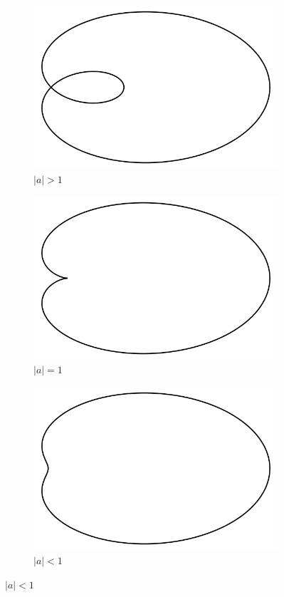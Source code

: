 \documentclass[12pt]{article}
\begin{document}
\begin{figure}[h!]
  \centering
      \begin{subfigure}[b]{0.3\linewidth}
    \includegraphics[width=\linewidth]{./assets/3-1-1/limacon-a-gt-1.png}
    \caption{$|a|>1$}
  \end{subfigure}
  \begin{subfigure}[b]{0.3\linewidth}
    \includegraphics[width=\linewidth]{./assets/3-1-1/limacon-a-eq-1.png}
    \caption{$|a|=1$}
  \end{subfigure}  
  \begin{subfigure}[b]{0.3\linewidth}
    \includegraphics[width=\linewidth]{./assets/3-1-1/limacon-a-lt-1.png}
    \caption{$|a|<1$}
  \end{subfigure}
 

\end{figure}
\end{document}
